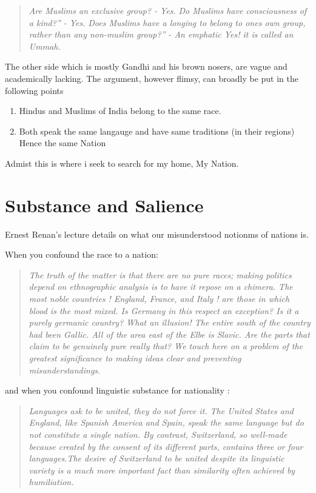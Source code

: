\documentclass[
]{book}
\providecommand{\tightlist}{%
  \setlength{\itemsep}{0pt}\setlength{\parskip}{0pt}}
\begin{document}
\begin{quote}
\emph{Are Muslims an exclusive group? - Yes.}
\emph{Do Muslims have consciousness of a kind?'' - Yes.}
\emph{Does Muslims have a longing to belong to ones own group, rather than any non-muslim group?'' - An emphatic Yes! it is called an Ummah.}
\end{quote}

The other side which is mostly Gandhi and his brown nosers, are vague and academically lacking. The argument, however flimsy, can broadly be put in the following points

\begin{enumerate}
\def\labelenumi{\arabic{enumi}.}
\tightlist
\item
  Hindus and Muslims of India belong to the same race.
\item
  Both speak the same langauge and have same traditions (in their regions)
  Hence the same Nation
\end{enumerate}

Admist this is where i seek to search for my home, My Nation.

\hypertarget{substance-and-salience}{%
\section{Substance and Salience}\label{substance-and-salience}}

Ernest Renan's lecture details on what our misunderstood notionms of nations is.

When you confound the race to a nation:

\begin{quote}
\emph{The truth of the matter is that there are no pure races; making politics depend on ethnographic analysis is to have it repose on a chimera. The most noble countries ! England, France, and Italy ! are those in which blood is the most mixed. Is Germany in this respect an exception? Is it a purely germanic country? What an illusion! The entire south of the country had been Gallic. All of the area east of the Elbe is Slavic. Are the parts that claim to be genuinely pure really that? We touch here on a problem of the greatest significance to making ideas clear and preventing misunderstandings.}
\end{quote}

and when you confound linguistic substance for nationality :

\begin{quote}
\emph{Languages ask to be united, they do not force it. The United States and England, like Spanish America and Spain, speak the same language but do not constitute a single nation. By contrast, Switzerland, so well-made because created by the consent of its different parts, contains three or four languages.The desire of Switzerland to be united despite its linguistic variety is a much more important fact than similarity often achieved by humiliation.}
\end{quote}
\end{document}

